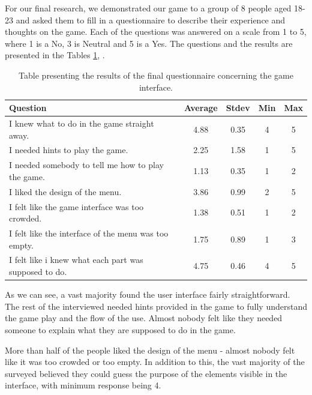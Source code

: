 For our final research, we demonstrated our game to a group of 8 people aged 18-23 and asked them to fill in a questionnaire to describe their experience and thoughts on the game. Each of the questions was answered on a scale from 1 to 5, where 1 is a No,  3 is Neutral and 5 is a Yes. The questions and the results are presented in the Tables \ref{table:finalquestionsinterface}, .

\begin{table}
\begin{center}
\begin{tabular}{| p{8cm} | c | c | c | c | } 																	  \hline 
 \textbf{Question} & \textbf{Average} & \textbf{Stdev} & \textbf{Min} & \textbf{Max } \\ \hline \hline
 I knew what to do in the game straight away. 				& 4.88 & 0.35 & 4 & 5		   \\ \hline 
 I needed hints to play the game. 								& 2.25 & 1.58 & 1 & 5 	   \\ \hline 
 I needed somebody to tell me how to play the game. 	& 1.13 & 0.35 & 1 & 2  	   \\ \hline 
 I liked the design of the menu. 									& 3.86 & 0.99 & 2 & 5   	   \\ \hline 
 I felt like the game interface was too crowded. 				& 1.38 & 0.51 & 1 & 2 	   \\ \hline 
 I felt like the interface of the menu was too empty.		& 1.75 & 0.89 & 1 & 3		   \\ \hline
 I felt like i knew what each part was supposed to do. 	& 4.75 & 0.46 & 4 & 5		   \\ \hline
\end{tabular}
\caption{Table presenting the results of the final questionnaire concerning the game interface.}
\label{table:finalquestionsinterface}
\end{center}
\end{table}

As we can see, a vast majority found the user interface fairly straightforward. The rest of the interviewed needed hints provided in the game to fully understand the game play and the flow of the use. Almost nobody felt like they needed someone to explain what they are supposed to do in the game. 

More than half of the people liked the design of the menu - almost nobody felt like it was too crowded or too empty. In addition to this, the vast majority of the surveyed believed they could guess the purpose of the elements visible in the interface, with minimum response being 4.

